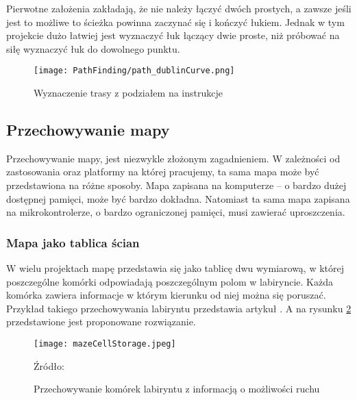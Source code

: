             Pierwotne założenia zakładają, że nie należy łączyć dwóch prostych, a zawsze jeśli jest to możliwe to ścieżka powinna zaczynać się i kończyć łukiem.
            Jednak w tym projekcie dużo łatwiej jest wyznaczyć łuk łączący dwie proste, niż próbować na siłę wyznaczyć łuk do dowolnego punktu.

            \begin{figure}[!ht]
                \centering
                \texttt{[image: PathFinding/path\_dublinCurve.png]}
                \caption{Wyznaczenie trasy z podziałem na instrukcje}
                \label{fig:path_dublin}
            \end{figure}

            

    \subsection{Przechowywanie mapy}
    \label{subsec:przechowywanie_mapy}
        Przechowywanie mapy, jest niezwykle złożonym zagadnieniem. 
        W zależności od zastosowania oraz platformy na której pracujemy, ta sama mapa może być przedstawiona na różne sposoby.
        Mapa zapisana na komputerze -- o bardzo dużej dostępnej pamięci, może być bardzo dokładna. 
        Natomiast ta sama mapa zapisana na mikrokontrolerze, o bardzo ograniczonej pamięci, musi zawierać uproszczenia.

        \subsubsection{Mapa jako tablica ścian}
            W wielu projektach mapę przedstawia się jako tablicę dwu wymiarową, w której poszczególne komórki odpowiadają poszczególnym polom w labiryncie.
            Każda komórka zawiera informacje w którym kierunku od niej można się poruszać.
            Przykład takiego przechowywania labiryntu przedstawia artykuł \cite{maze_storage}.
            A na rysunku \ref{fig:mazeCellStorage} przedstawione jest proponowane rozwiązanie.

            \begin{figure}[!ht]
                \centering
                \texttt{[image: mazeCellStorage.jpeg]}
                \caption{Przechowywanie komórek labiryntu z informacją o możliwości ruchu}
                Źródło: \cite{maze_storage}
                \label{fig:mazeCellStorage}
            \end{figure}

